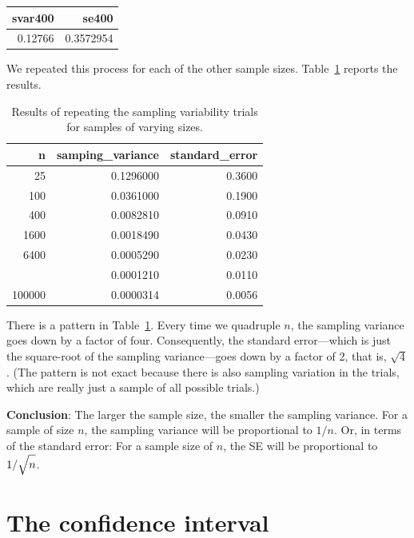 \documentclass[
  letterpaper,
  DIV=11,
  numbers=noendperiod,
  oneside]{scrreprt}
\begin{document}
\ttfamily 
\begin{tabular}{rr}
\toprule
svar400 & se400\\
\midrule
0.12766 & 0.3572954\\
\bottomrule
\end{tabular} \normalfont
\bigskip

We repeated this process for each of the other sample sizes.
Table~\ref{tbl-se-sizes} reports the results.

\hypertarget{tbl-se-sizes}{}
\ttfamily 
\begin{table}
\caption{\label{tbl-se-sizes}Results of repeating the sampling variability trials for samples of
varying sizes. }\tabularnewline

\centering
\begin{tabular}{rrr}
\toprule
n & samping\_variance & standard\_error\\
\midrule
25 & 0.1296000 & 0.3600\\
100 & 0.0361000 & 0.1900\\
400 & 0.0082810 & 0.0910\\
1600 & 0.0018490 & 0.0430\\
6400 & 0.0005290 & 0.0230\\
\addlinespace
25000 & 0.0001210 & 0.0110\\
100000 & 0.0000314 & 0.0056\\
\bottomrule
\end{tabular}
\end{table}
 \normalfont
\bigskip

There is a pattern in Table~\ref{tbl-se-sizes}. Every time we quadruple
\(n\), the sampling variance goes down by a factor of four.
Consequently, the standard error---which is just the square-root of the
sampling variance---goes down by a factor of 2, that is, \(\sqrt{4}\).
(The pattern is not exact because there is also sampling variation in
the trials, which are really just a sample of all possible trials.)

\textbf{Conclusion}: The larger the sample size, the smaller the
sampling variance. For a sample of size \(n\), the sampling variance
will be proportional to \(1/n\). Or, in terms of the standard error: For
a sample size of \(n\), the SE will be proportional to
\(1/\sqrt{\strut n}\).

\hypertarget{the-confidence-interval}{%
\section{The confidence interval}\label{the-confidence-interval}}
\end{document}
